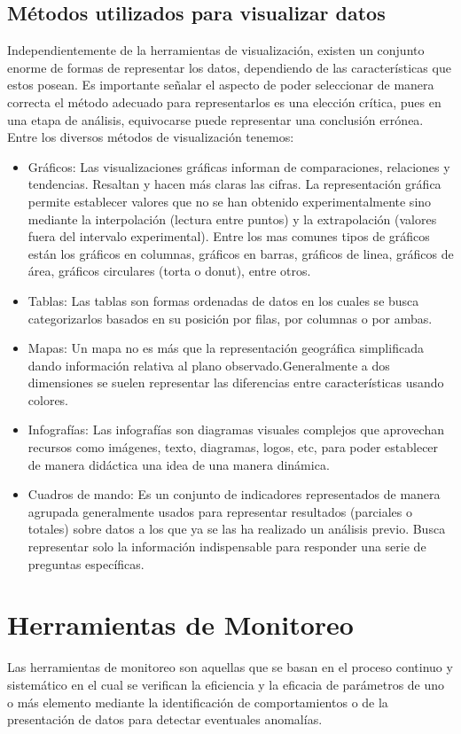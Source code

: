 \subsection{Métodos utilizados para visualizar datos}
Independientemente de la herramientas de visualización, existen un conjunto enorme de formas de representar los datos, dependiendo de las características que estos posean. Es importante señalar el aspecto de poder seleccionar de manera correcta el método adecuado para representarlos es una elección crítica, pues en una etapa de análisis, equivocarse puede representar una conclusión errónea.\\

Entre los diversos métodos de visualización tenemos:
\begin{itemize}
\item Gráficos: Las visualizaciones gráficas informan de comparaciones, relaciones y tendencias. Resaltan y hacen más claras las cifras.\cite{ibmviz} La representación gráfica permite establecer valores que no se han obtenido experimentalmente sino mediante la interpolación (lectura entre puntos) y la extrapolación (valores fuera del intervalo experimental). Entre los mas comunes tipos de gráficos están los gráficos en columnas, gráficos en barras, gráficos de linea, gráficos de área, gráficos circulares (torta o donut), entre otros.  
\item Tablas: Las tablas son formas ordenadas de datos en los cuales se busca categorizarlos basados en su posición por filas, por columnas o por ambas.
\item Mapas: Un mapa no es más que la representación geográfica simplificada dando información relativa al plano observado.Generalmente a dos dimensiones se suelen representar las diferencias entre características usando colores.
\item Infografías: Las infografías son diagramas visuales complejos que aprovechan recursos como imágenes, texto, diagramas, logos, etc, para poder establecer de manera didáctica una idea de una manera dinámica.\
\item Cuadros de mando: Es un conjunto de indicadores representados de manera agrupada generalmente usados para representar resultados (parciales o totales) sobre datos a los que ya se las ha realizado un análisis previo. Busca representar solo la información indispensable para responder una serie de preguntas específicas.   
\end{itemize}


\section{Herramientas de Monitoreo}
Las herramientas de monitoreo son aquellas que se basan en el proceso continuo y sistemático en el cual se verifican la eficiencia y la eficacia de parámetros de uno o más elemento mediante la identificación de comportamientos o de la presentación de datos para detectar eventuales anomalías.\\

